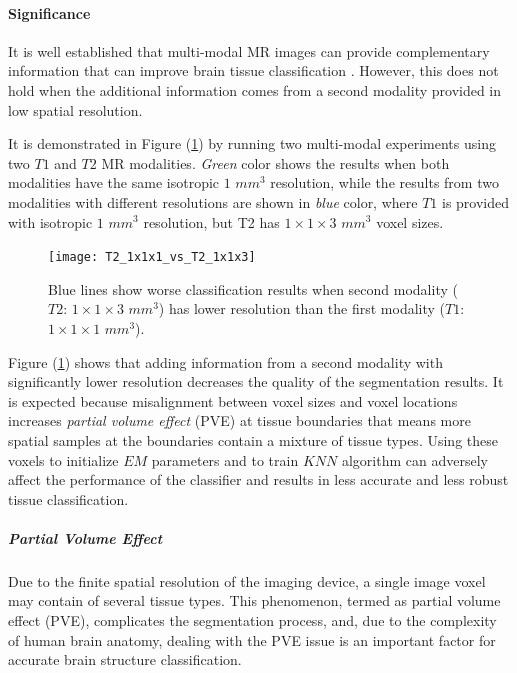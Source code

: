 \paragraph{Significance}

It is well established that multi-modal MR images can provide complementary information that can improve brain tissue classification \cite{Kim2013}. 
However, this does not hold when the additional information comes from a second modality provided in low spatial resolution.

It is demonstrated in Figure (\ref{T2_1x1x1_vs_T2_1x1x3}) by running two multi-modal experiments using two $T1$ and $T2$ MR modalities. \textit{Green} color shows the results when both modalities have the same isotropic $1$ $mm^3$ resolution, while the results from two modalities with different resolutions are shown in \textit{blue} color, where $T1$ is provided with isotropic $1$ $mm^3$ resolution, but T2 has $1 \times 1 \times 3$ $mm^3$ voxel sizes.

\begin{figure}
\centering
\texttt{[image: T2\_1x1x1\_vs\_T2\_1x1x3]}\
\centering
\caption{Blue lines show worse classification results when second modality ($T2$: $1 \times 1 \times 3$ $mm^3$) has lower resolution than the first modality ($T1$: $1 \times 1 \times 1$ $mm^3$).} 
\label{T2_1x1x1_vs_T2_1x1x3}
\end{figure}

Figure (\ref{T2_1x1x1_vs_T2_1x1x3}) shows that adding information from a second modality with significantly lower resolution decreases the quality of the segmentation results.
It is expected because misalignment between voxel sizes and voxel locations increases \textit{partial volume effect} (PVE) at tissue boundaries that means more spatial samples at the boundaries contain a mixture of tissue types. Using these voxels to initialize $EM$ parameters and to train $KNN$ algorithm can adversely affect the performance of the classifier and results in less accurate and less robust tissue classification.

\subparagraph{Partial Volume Effect}

Due to the finite spatial resolution of the imaging device, a single image voxel may contain of several tissue types. This phenomenon, termed as partial volume effect (PVE), complicates the segmentation process, and, due to the complexity of human brain anatomy, dealing with the PVE issue is an important factor for accurate brain structure classification.


